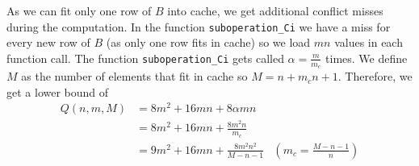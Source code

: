 \documentclass[a4paper]{article}
\begin{document}
\begin{enumerate}
\begin{enumerate}
            As we can fit only one row of $B$ into cache, we get additional
        conflict misses during the computation. In the function
        \texttt{suboperation\_Ci} we have a miss for every new row of $B$ (as only
        one row fits in cache) so we load $mn$ values in each function call.
        The function \texttt{suboperation\_Ci} gets called 
        $\alpha = \frac{m}{m_c}$ times. We define $M$ as the number of elements
        that fit in cache so $M = n + m_c n + 1$. Therefore, we get a lower
        bound of
        \begin{align*}
        Q(n,m,M) &= 8m^2 + 16mn + 8\alpha m n\\
        &= 8m^2 + 16mn + \frac{8m^2n}{m_c}\\
        &= 9m^2 + 16mn + \frac{8m^2n^2}{M-n-1} & (m_c = \frac{M-n-1}{n})
        \end{align*} 
        \end{enumerate}
\end{enumerate}
\end{document}
